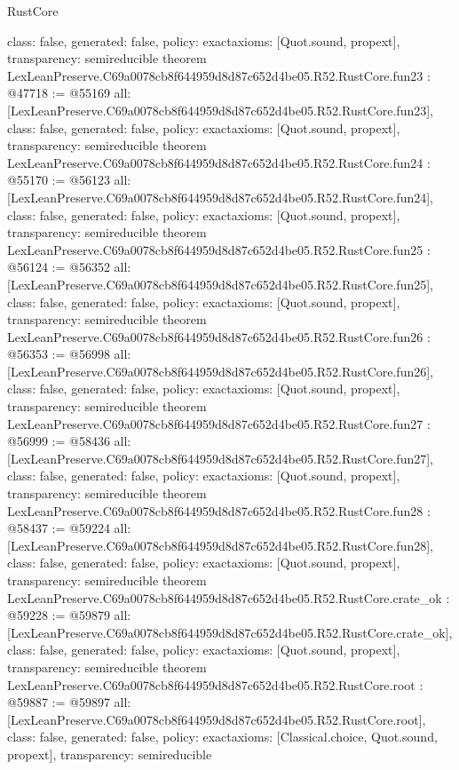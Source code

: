 \begin{lexlean}{RustCore}
\begin{coremodule}
{  class: false,
  generated: false,
  policy: exact{axioms: [Quot.sound, propext]},
  transparency: semireducible
}
theorem LexLeanPreserve.C69a0078cb8f644959d8d87c652d4be05.R52.RustCore.fun23 : @47718 := @55169 {
  all: [LexLeanPreserve.C69a0078cb8f644959d8d87c652d4be05.R52.RustCore.fun23],
  class: false,
  generated: false,
  policy: exact{axioms: [Quot.sound, propext]},
  transparency: semireducible
}
theorem LexLeanPreserve.C69a0078cb8f644959d8d87c652d4be05.R52.RustCore.fun24 : @55170 := @56123 {
  all: [LexLeanPreserve.C69a0078cb8f644959d8d87c652d4be05.R52.RustCore.fun24],
  class: false,
  generated: false,
  policy: exact{axioms: [Quot.sound, propext]},
  transparency: semireducible
}
theorem LexLeanPreserve.C69a0078cb8f644959d8d87c652d4be05.R52.RustCore.fun25 : @56124 := @56352 {
  all: [LexLeanPreserve.C69a0078cb8f644959d8d87c652d4be05.R52.RustCore.fun25],
  class: false,
  generated: false,
  policy: exact{axioms: [Quot.sound, propext]},
  transparency: semireducible
}
theorem LexLeanPreserve.C69a0078cb8f644959d8d87c652d4be05.R52.RustCore.fun26 : @56353 := @56998 {
  all: [LexLeanPreserve.C69a0078cb8f644959d8d87c652d4be05.R52.RustCore.fun26],
  class: false,
  generated: false,
  policy: exact{axioms: [Quot.sound, propext]},
  transparency: semireducible
}
theorem LexLeanPreserve.C69a0078cb8f644959d8d87c652d4be05.R52.RustCore.fun27 : @56999 := @58436 {
  all: [LexLeanPreserve.C69a0078cb8f644959d8d87c652d4be05.R52.RustCore.fun27],
  class: false,
  generated: false,
  policy: exact{axioms: [Quot.sound, propext]},
  transparency: semireducible
}
theorem LexLeanPreserve.C69a0078cb8f644959d8d87c652d4be05.R52.RustCore.fun28 : @58437 := @59224 {
  all: [LexLeanPreserve.C69a0078cb8f644959d8d87c652d4be05.R52.RustCore.fun28],
  class: false,
  generated: false,
  policy: exact{axioms: [Quot.sound, propext]},
  transparency: semireducible
}
theorem LexLeanPreserve.C69a0078cb8f644959d8d87c652d4be05.R52.RustCore.crate_ok : @59228 := @59879 {
  all: [LexLeanPreserve.C69a0078cb8f644959d8d87c652d4be05.R52.RustCore.crate_ok],
  class: false,
  generated: false,
  policy: exact{axioms: [Quot.sound, propext]},
  transparency: semireducible
}
theorem LexLeanPreserve.C69a0078cb8f644959d8d87c652d4be05.R52.RustCore.root : @59887 := @59897 {
  all: [LexLeanPreserve.C69a0078cb8f644959d8d87c652d4be05.R52.RustCore.root],
  class: false,
  generated: false,
  policy: exact{axioms: [Classical.choice, Quot.sound, propext]},
  transparency: semireducible
}


\end{coremodule}
\end{lexlean}
